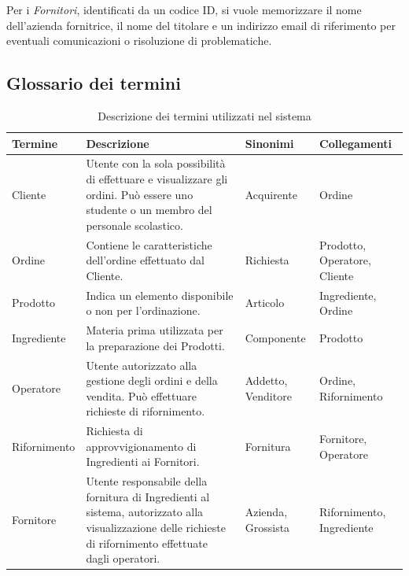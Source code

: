 \documentclass[12pt,a4paper]{article}
\begin{document}
    \vspace{8pt}
    \noindent
    Per i \textit{Fornitori}, identificati da un codice ID, si vuole memorizzare il nome dell'azienda fornitrice, il nome del titolare e un indirizzo email di riferimento per eventuali comunicazioni o risoluzione di problematiche.

    \subsection{Glossario dei termini}
    \begin{table}[h]
        \renewcommand{\arraystretch}{1.3} %
        \centering
        \begin{tabular}{|m{3cm}|m{6cm}|m{3cm}|m{3cm}|}
            \hline
            \textbf{Termine} & \textbf{Descrizione} & \textbf{Sinonimi} & \textbf{Collegamenti} \\
            \hline
            Cliente & Utente con la sola possibilità di effettuare e visualizzare gli ordini. Può essere uno studente o un membro del personale scolastico. & Acquirente & Ordine \\
            \hline
            Ordine & Contiene le caratteristiche dell'ordine effettuato dal Cliente. & Richiesta & Prodotto, Operatore, Cliente \\
            \hline
            Prodotto & Indica un elemento disponibile o non per l'ordinazione. & Articolo & Ingrediente, Ordine \\
            \hline
            Ingrediente & Materia prima utilizzata per la preparazione dei Prodotti. & Componente & Prodotto \\
            \hline
            Operatore & Utente autorizzato alla gestione degli ordini e della vendita. Può effettuare richieste di rifornimento. & Addetto, Venditore & Ordine, Rifornimento \\
            \hline
            Rifornimento & Richiesta di approvvigionamento di Ingredienti ai Fornitori. & Fornitura & Fornitore, Operatore \\
            \hline
            Fornitore & Utente responsabile della fornitura di Ingredienti al sistema, autorizzato alla visualizzazione delle richieste di rifornimento effettuate dagli operatori. & Azienda, Grossista & Rifornimento, Ingrediente \\
            \hline
        \end{tabular}
        \caption{Descrizione dei termini utilizzati nel sistema}
        \label{tab:termini}
        \vspace{-20pt}
    \end{table}
\end{document}

